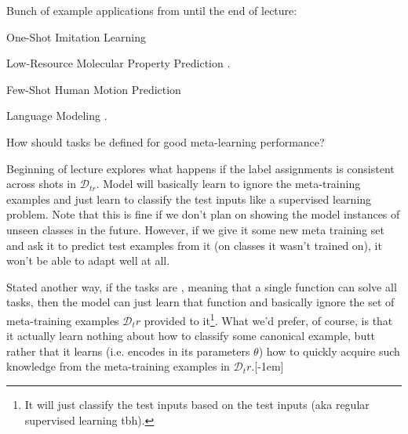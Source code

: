 \documentclass[11pt]{article}
\begin{document}
Bunch of example applications from  until the end of lecture:
\begin{compactitem}
	\item One-Shot Imitation Learning
	
	\item Low-Resource Molecular Property Prediction .
	
	\item Few-Shot Human Motion Prediction 
	
	\item Language Modeling . 
\end{compactitem}






\begin{myquote}
	How should tasks be defined for good meta-learning performance?
\end{myquote} 
	
Beginning of lecture explores what happens if the label assignments is consistent across shots in $\mathcal{D}_{tr}$. Model will basically learn to ignore the meta-training examples and just learn to classify the test inputs like a supervised learning problem. Note that this is fine if we don't plan on showing the model instances of unseen classes in the future. However, if we give it some new meta training set and ask it to predict test examples from it (on classes it wasn't trained on), it won't be able to adapt well at all. 

Stated another way, if the tasks are , meaning that a single function can solve all tasks, then the model can just learn that function and basically ignore the set of meta-training examples $\mathcal{D}_tr$ provided to it\footnote{It will just classify the test inputs based on the test inputs (aka regular supervised learning tbh).}. What we'd prefer, of course, is that it actually learn nothing about how to classify some canonical example, butt rather that it learns (i.e. encodes in its parameters $\theta$) how to quickly acquire such knowledge from the meta-training examples in $\mathcal{D}_tr$.[-1em]
\end{document}
